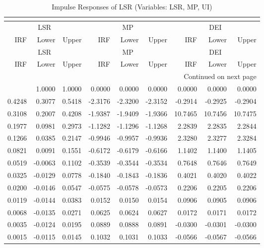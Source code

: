 \begin{longtable}{rrrrrrrrr}
\caption{Impulse Responses of LSR (Variables: LSR, MP, UI)}\\
\label{tab:lsr_irf_group1}\\
\toprule
\multicolumn{3}{c}{LSR} & \multicolumn{3}{c}{MP} & \multicolumn{3}{c}{DEI} \\
IRF & Lower & Upper & IRF & Lower & Upper & IRF & Lower & Upper \\
\midrule
\endfirsthead
\toprule
\multicolumn{3}{c}{LSR} & \multicolumn{3}{c}{MP} & \multicolumn{3}{c}{DEI} \\
IRF & Lower & Upper & IRF & Lower & Upper & IRF & Lower & Upper \\
\midrule
\endhead
\midrule
\multicolumn{9}{r}{Continued on next page} \\
\midrule
\endfoot
\bottomrule
\endlastfoot
1.0000 & 1.0000 & 1.0000 & 0.0000 & 0.0000 & 0.0000 & 0.0000 & 0.0000 & 0.0000 \\
0.4248 & 0.3077 & 0.5418 & -2.3176 & -2.3200 & -2.3152 & -0.2914 & -0.2925 & -0.2904 \\
0.3108 & 0.2007 & 0.4208 & -1.9387 & -1.9409 & -1.9366 & 10.7465 & 10.7456 & 10.7475 \\
0.1977 & 0.0981 & 0.2973 & -1.1282 & -1.1296 & -1.1268 & 2.2839 & 2.2835 & 2.2844 \\
0.1266 & 0.0385 & 0.2147 & -0.9946 & -0.9957 & -0.9936 & 2.3280 & 2.3277 & 2.3284 \\
0.0821 & 0.0091 & 0.1551 & -0.6172 & -0.6179 & -0.6166 & 1.1402 & 1.1400 & 1.1405 \\
0.0519 & -0.0063 & 0.1102 & -0.3539 & -0.3544 & -0.3534 & 0.7648 & 0.7646 & 0.7649 \\
0.0325 & -0.0129 & 0.0778 & -0.1840 & -0.1843 & -0.1836 & 0.4021 & 0.4020 & 0.4022 \\
0.0200 & -0.0146 & 0.0547 & -0.0575 & -0.0578 & -0.0573 & 0.2206 & 0.2205 & 0.2206 \\
0.0119 & -0.0144 & 0.0383 & 0.0152 & 0.0150 & 0.0154 & 0.0906 & 0.0905 & 0.0906 \\
0.0068 & -0.0135 & 0.0271 & 0.0625 & 0.0624 & 0.0627 & 0.0172 & 0.0171 & 0.0172 \\
0.0035 & -0.0124 & 0.0195 & 0.0889 & 0.0888 & 0.0891 & -0.0300 & -0.0301 & -0.0300 \\
0.0015 & -0.0115 & 0.0145 & 0.1032 & 0.1031 & 0.1033 & -0.0566 & -0.0567 & -0.0566 \\
\end{longtable}